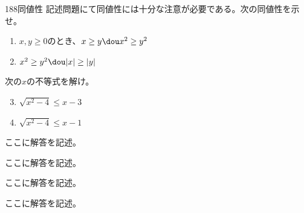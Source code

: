 \begin{prob}{188}{}{同値性}
 記述問題にて同値性には十分な注意が必要である。次の同値性を示せ。
 \begin{enumerate}
  \item $x, y\ge 0$のとき、$x\ge y \dou x^2\ge y^2$
  \item $x^2\ge y^2 \dou |x|\ge |y|$
 \end{enumerate}
 次の$x$の不等式を解け。
 \begin{enumerate}
  \setcounter{enumi}{2}
  \item $\sqrt{x^2-4}\le x-3$
  \item $\sqrt{x^2-4}\le x-1$
 \end{enumerate}
\end{prob}
ここに解答を記述。

ここに解答を記述。

ここに解答を記述。

ここに解答を記述。